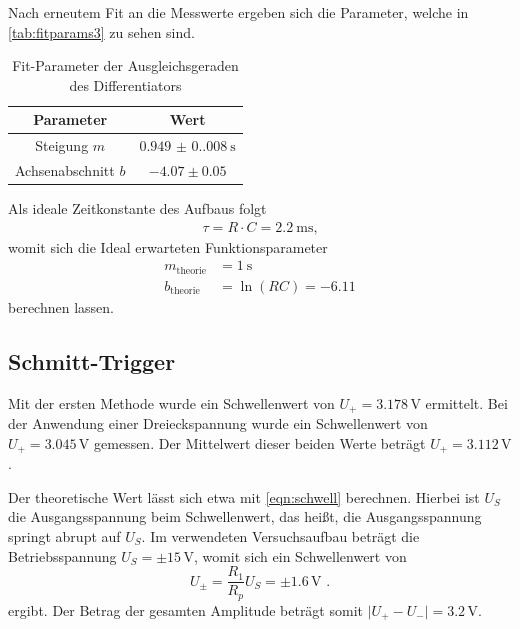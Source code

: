 \documentclass[12pt]{article}
\begin{document}
Nach erneutem Fit an die Messwerte ergeben sich die Parameter, welche in \autoref{tab:fitparams3} zu sehen sind.
\begin{table}[H]
  \centering
  \caption{Fit-Parameter der Ausgleichsgeraden des Differentiators}
  \begin{tabular}{c c}
  \toprule
  Parameter & Wert \\
  \midrule
  Steigung $m$ & $\SI{0.949(0.008)}{\second}$ \\
  Achsenabschnitt $b$ & $-4.07\pm0.05$ \\
  \bottomrule
  \end{tabular}
  \label{tab:fitparams3}
\end{table}
Als ideale Zeitkonstante des Aufbaus folgt
\begin{align}
  \tau = R\cdot C = \SI{2.2}{\milli\second}\text{,}
\end{align}
womit sich die Ideal erwarteten Funktionsparameter
\begin{align}
  m_\text{theorie} &= \SI{1}{\second}\\
  b_\text{theorie} &= \ln(RC) = -6.11
\end{align}
berechnen lassen.
\subsection{Schmitt-Trigger}
Mit der ersten Methode wurde ein Schwellenwert von $U_+ = 3.178\,\unit{\volt}$ ermittelt. Bei der Anwendung einer Dreieckspannung wurde ein Schwellenwert von $U_+ = 3.045\,\unit{\volt}$ gemessen. Der Mittelwert dieser beiden Werte beträgt $U_+ = 3.112\,\unit{\volt}$. 

Der theoretische Wert lässt sich etwa mit \autoref{eqn:schwell} berechnen. Hierbei ist $U_S$ die Ausgangsspannung beim Schwellenwert, das heißt, die Ausgangsspannung springt abrupt auf $U_S$. Im verwendeten Versuchsaufbau beträgt die Betriebsspannung $U_S = \pm 15\,\unit{\volt}$, womit sich ein Schwellenwert von
\begin{equation*}
    U_{\pm} = \frac{R_1}{R_p}U_S = \pm 1.6\,\unit{\volt} \,\, .
\end{equation*}
ergibt. Der Betrag der gesamten Amplitude beträgt somit $\lvert U_+ - U_- \rvert = 3.2\,\unit{\volt}$.
\end{document}
